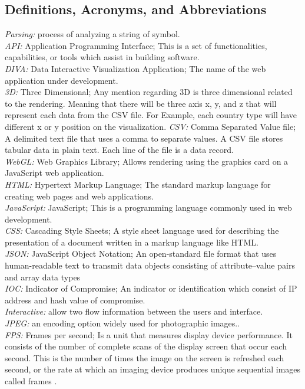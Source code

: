 \documentclass[journal,10pt,onecolumn,compsoc]{IEEEtran} \usepackage[margin=1.0in]{geometry} \usepackage{pdfpages}
\begin{document}
    \subsection{Definitions, Acronyms, and Abbreviations}
    \textit{Parsing: } process of analyzing a string of symbol.\\
    \textit{API: } Application Programming Interface; This is a set of functionalities, capabilities, or tools which assist in building software. \\
    \textit{DIVA: } Data Interactive Visualization Application; The name of the web application under development. \\
    \textit{3D: } Three Dimensional; Any mention regarding 3D is three dimensional related to the rendering. Meaning that there will be three axis x, y, and z that will represent each data from the CSV file. For Example, each country type will have different x or y position on the visualization.
    \textit{CSV: } Comma Separated Value file; A delimited text file that uses a comma to separate values. A CSV file stores tabular data in plain text. Each line of the file is a data record. \\
    \textit{WebGL:} Web Graphics Library; Allows rendering using the graphics card on a JavaScript web application.\\
    \textit{HTML:} Hypertext Markup Language; The standard markup language for creating web pages and web applications. \\
    \textit {JavaScript: }JavaScript; This is a programming language commonly used in web development. \\
    \textit{CSS: }Cascading Style Sheets; A style sheet language used for describing the presentation of a document written in a markup language like HTML. \\
    \textit{JSON: }JavaScript Object Notation; An open-standard file format that uses human-readable text to transmit data objects consisting of attribute–value pairs and array data types\\
    \textit{IOC: }Indicator of Compromise; An indicator or identification which consist of IP address and hash value of compromise.\\
    \textit{Interactive: }allow two flow information between the users and interface.\\
    \textit{JPEG: }an encoding option widely used for photographic images.\cite{JPEG}.\\
    \textit{FPS: }Frames per second; Is a unit that measures display device performance. It consists of the number of complete scans of the display screen that occur each second. This is the number of times the image on the screen is refreshed each second, or the rate at which an imaging device produces unique sequential images called frames \cite{FPS}.\\
    
\end{document}
